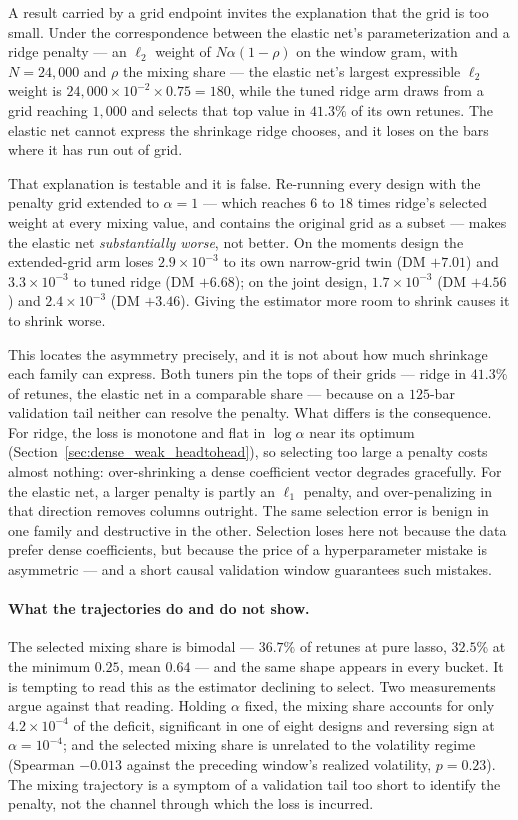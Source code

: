 A result carried by a grid endpoint invites the explanation that the
grid is too small. Under the correspondence between the elastic net's
parameterization and a ridge penalty --- an $\ell_2$ weight of $N \alpha
(1 - \rho)$ on the window gram, with $N = 24{,}000$ and $\rho$ the
mixing share --- the elastic net's largest expressible $\ell_2$ weight
is $24{,}000 \times 10^{-2} \times 0.75 = 180$, while the tuned ridge
arm draws from a grid reaching $1{,}000$ and selects that top value in
$41.3\%$ of its own retunes. The elastic net cannot express the
shrinkage ridge chooses, and it loses on the bars where it has run out
of grid.

That explanation is testable and it is false. Re-running every design
with the penalty grid extended to $\alpha = 1$ --- which reaches $6$ to
$18$ times ridge's selected weight at every mixing value, and contains
the original grid as a subset --- makes the elastic net
\emph{substantially worse}, not better. On the moments design the
extended-grid arm loses $2.9 \times 10^{-3}$ to its own narrow-grid twin
(DM $+7.01$) and $3.3 \times 10^{-3}$ to tuned ridge (DM $+6.68$); on
the joint design, $1.7 \times 10^{-3}$ (DM $+4.56$) and $2.4 \times
10^{-3}$ (DM $+3.46$). Giving the estimator more room to shrink causes
it to shrink worse.

This locates the asymmetry precisely, and it is not about how much
shrinkage each family can express. Both tuners pin the tops of their
grids --- ridge in $41.3\%$ of retunes, the elastic net in a comparable
share --- because on a $125$-bar validation tail neither can resolve the
penalty. What differs is the consequence. For ridge, the loss is
monotone and flat in $\log \alpha$ near its optimum
(Section~\ref{sec:dense_weak_headtohead}), so selecting too large a
penalty costs almost nothing: over-shrinking a dense coefficient vector
degrades gracefully. For the elastic net, a larger penalty is partly an
$\ell_1$ penalty, and over-penalizing in that direction removes columns
outright. The same selection error is benign in one family and
destructive in the other. Selection loses here not because the data
prefer dense coefficients, but because the price of a hyperparameter
mistake is asymmetric --- and a short causal validation window
guarantees such mistakes.

\paragraph{What the trajectories do and do not show.}
The selected mixing share is bimodal --- $36.7\%$ of retunes at pure
lasso, $32.5\%$ at the minimum $0.25$, mean $0.64$ --- and the same
shape appears in every bucket. It is tempting to read this as the
estimator declining to select. Two measurements argue against that
reading. Holding $\alpha$ fixed, the mixing share accounts for only
$4.2 \times 10^{-4}$ of the deficit, significant in one of eight designs
and reversing sign at $\alpha = 10^{-4}$; and the selected mixing share
is unrelated to the volatility regime (Spearman $-0.013$ against the
preceding window's realized volatility, $p = 0.23$). The mixing
trajectory is a symptom of a validation tail too short to identify the
penalty, not the channel through which the loss is incurred.

